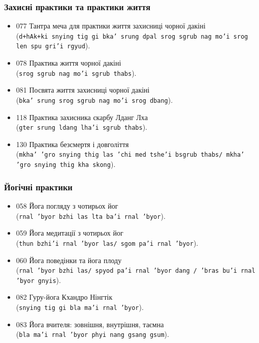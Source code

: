 \documentclass{article}
\begin{document}
\subsubsection{Захисні практики та практики життя}

\begingroup\raggedright
\begin{itemize}
\item 077 Тантра меча для практики життя захисниці чорної дакіні \\ (\texttt{d+hAk+ki snying tig gi bka' srung dpal srog sgrub nag mo'i srog len spu gri'i rgyud}).
\item 078 Практика життя чорної дакіні \\ (\texttt{srog sgrub nag mo'i sgrub thabs}).
\item 081 Посвята життя захисниці чорної дакіні \\ (\texttt{bka' srung srog sgrub nag mo'i srog dbang}).
\item 118 Практика захисника скарбу Лданг Лха \\ (\texttt{gter srung ldang lha'i sgrub thabs}).
\item 130 Практика безсмертя і довголіття \\ (\texttt{mkha' 'gro snying thig las 'chi med tshe'i bsgrub thabs/ mkha' 'gro snying thig kha skong}).
\end{itemize}
\endgroup

\subsubsection{Йогічні практики}

\begingroup\raggedright
\begin{itemize}
\item 058 Йога погляду з чотирьох йог \\ (\texttt{rnal 'byor bzhi las lta ba'i rnal 'byor}).
\item 059 Йога медитації з чотирьох йог \\ (\texttt{thun bzhi'i rnal 'byor las/ sgom pa'i rnal 'byor}).
\item 060 Йога поведінки та йога плоду \\ (\texttt{rnal 'byor bzhi las/ spyod pa'i rnal 'byor dang / 'bras bu'i rnal 'byor gnyis}).
\item 082 Гуру-йога Кхандро Нінгтік \\ (\texttt{snying tig gi bla ma'i rnal 'byor}).
\item 083 Йога вчителя: зовнішня, внутрішня, таємна \\ (\texttt{bla ma'i rnal 'byor phyi nang gsang gsum}).
\end{itemize}
\endgroup
\end{document}
